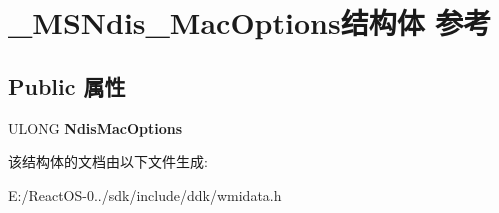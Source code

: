 \hypertarget{struct___m_s_ndis___mac_options}{}\section{\+\_\+\+M\+S\+Ndis\+\_\+\+Mac\+Options结构体 参考}
\label{struct___m_s_ndis___mac_options}
\subsection*{Public 属性}
\begin{DoxyCompactItemize}
\item 
\mbox{\label{struct___m_s_ndis___mac_options_a11df1b9bd390a5c0049d52d60b91a30f}} 
U\+L\+O\+NG {\bfseries Ndis\+Mac\+Options}
\end{DoxyCompactItemize}


该结构体的文档由以下文件生成\+:\begin{DoxyCompactItemize}
\item 
E\+:/\+React\+O\+S-\/0../sdk/include/ddk/wmidata.\+h\end{DoxyCompactItemize}

